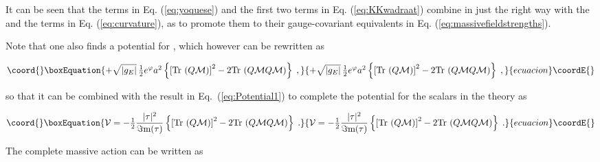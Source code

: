 \documentclass[12pt,a4paper]{article}
\begin{document}
It can be seen that the terms in Eq. (\ref{eq:yoquese}) and the first
two terms in Eq. (\ref{eq:KKwadraat}) combine in just the right way
with the \coordHE{} and the \coordHE{}
terms in Eq. (\ref{eq:curvature}), as to promote them to their
gauge-covariant equivalents in Eq. (\ref{eq:massivefieldstrengths}).

Note that one also finds a potential for \coordHE{}, which
however can be rewritten as

%
\begin{equation}\coord{}\boxEquation{
+\sqrt{|g_{E}|}\, \textstyle{\frac{1}{2}} e^{\varphi}a^{2}
\left\{\left[{\rm Tr}\, \left( Q\mathcal{M}\right)\right]^{2}
-2{\rm Tr}\, \left( Q\mathcal{M}Q\mathcal{M} \right)
\right\} \; ,
\label{eq:Potential2}
}{
+\sqrt{|g_{E}|}\, \textstyle{\frac{1}{2}} e^{\varphi}a^{2}
\left\{\left[{\rm Tr}\, \left( Q\mathcal{M}\right)\right]^{2}
-2{\rm Tr}\, \left( Q\mathcal{M}Q\mathcal{M} \right)
\right\} \; ,
}{ecuacion}\coordE{}\end{equation}

\noindent so that it can be combined with the result in 
Eq.~(\ref{eq:Potential1}) to complete the potential for the scalars in
the \coordHE{} theory as

\begin{equation}\coord{}\boxEquation{
{\cal V} =
-{\textstyle\frac{1}{2}}
\frac{|\tau |^{2}}{\Im{\rm m} (\tau )}
\left\{\left[{\rm Tr}\, \left( Q\mathcal{M}\right)\right]^{2}
-2{\rm Tr}\, \left( Q\mathcal{M}Q\mathcal{M} \right)
\right\} \; .
}{
{\cal V} =
-{\textstyle\frac{1}{2}}
\frac{|\tau |^{2}}{\Im{\rm m} (\tau )}
\left\{\left[{\rm Tr}\, \left( Q\mathcal{M}\right)\right]^{2}
-2{\rm Tr}\, \left( Q\mathcal{M}Q\mathcal{M} \right)
\right\} \; .
}{ecuacion}\coordE{}\end{equation}

The complete \coordHE{} massive action can be written as
\end{document}
